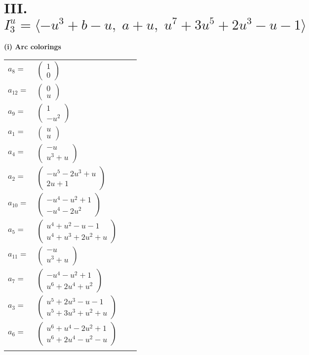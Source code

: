 \documentclass[1p]{elsarticle_modified}
\theoremstyle{definition}
\begin{document}
\centering \section*{III. $I^u_{3}= \langle - u^3+b- u,\;a+u,\;u^7+3 u^5+2 u^3- u-1 \rangle$}
\flushleft \textbf{(i) Arc colorings}\\
\begin{tabular}{m{7pt} m{180pt} m{7pt} m{180pt} }
\flushright $a_{8}=$&$\begin{pmatrix}1\\0\end{pmatrix}$ \\
\flushright $a_{12}=$&$\begin{pmatrix}0\\u\end{pmatrix}$ \\
\flushright $a_{9}=$&$\begin{pmatrix}1\\- u^2\end{pmatrix}$ \\
\flushright $a_{1}=$&$\begin{pmatrix}u\\u\end{pmatrix}$ \\
\flushright $a_{4}=$&$\begin{pmatrix}- u\\u^3+u\end{pmatrix}$ \\
\flushright $a_{2}=$&$\begin{pmatrix}- u^5-2 u^3+u\\2 u+1\end{pmatrix}$ \\
\flushright $a_{10}=$&$\begin{pmatrix}- u^4- u^2+1\\- u^4-2 u^2\end{pmatrix}$ \\
\flushright $a_{5}=$&$\begin{pmatrix}u^4+u^2- u-1\\u^4+u^3+2 u^2+u\end{pmatrix}$ \\
\flushright $a_{11}=$&$\begin{pmatrix}- u\\u^3+u\end{pmatrix}$ \\
\flushright $a_{7}=$&$\begin{pmatrix}- u^4- u^2+1\\u^6+2 u^4+u^2\end{pmatrix}$ \\
\flushright $a_{3}=$&$\begin{pmatrix}u^5+2 u^3- u-1\\u^5+3 u^3+u^2+u\end{pmatrix}$ \\
\flushright $a_{6}=$&$\begin{pmatrix}u^6+u^4-2 u^2+1\\u^6+2 u^4- u^2- u\end{pmatrix}$\\&\end{tabular}
\end{document}
